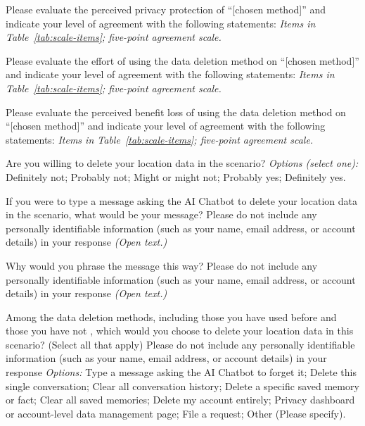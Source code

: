 {\begin{description}[leftmargin=0pt,itemsep=1pt,font=\normalfont]
\item[\textbf{Q4.7}] Please evaluate the perceived privacy protection of ``[chosen method]'' and indicate your level of agreement with the following statements: \emph{Items in Table~\ref{tab:scale-items}; five-point agreement scale.}
\item[\textbf{Q4.8}] Please evaluate the effort of using the data deletion method on ``[chosen method]'' and indicate your level of agreement with the following statements: \emph{Items in Table~\ref{tab:scale-items}; five-point agreement scale.}
\item[\textbf{Q4.9}] Please evaluate the perceived benefit loss of using the data deletion method on ``[chosen method]'' and indicate your level of agreement with the following statements: \emph{Items in Table~\ref{tab:scale-items}; five-point agreement scale.}
\item[\textbf{Q4.10}] Are you willing to delete your location data in the scenario? \emph{Options (select one):} Definitely not; Probably not; Might or might not; Probably yes; Definitely yes.
\item[\textbf{Q4.11}] If you were to type a message asking the AI Chatbot to delete your location data in the scenario, what would be your message? Please do not include any personally identifiable information (such as your name, email address, or account details) in your response \emph{(Open text.)}
\item[\textbf{Q4.12}] Why would you phrase the message this way? Please do not include any personally identifiable information (such as your name, email address, or account details) in your response \emph{(Open text.)}
\item[\textbf{Q4.13}] Among the data deletion methods, including those you have used before and those you have not , which would you choose to delete your location data in this scenario? (Select all that apply) Please do not include any personally identifiable information (such as your name, email address, or account details) in your response \emph{Options:} Type a message asking the AI Chatbot to forget it; Delete this single conversation; Clear all conversation history; Delete a specific saved memory or fact; Clear all saved memories; Delete my account entirely; Privacy dashboard or account-level data management page; File a request; Other (Please specify).
\end{description}

}
